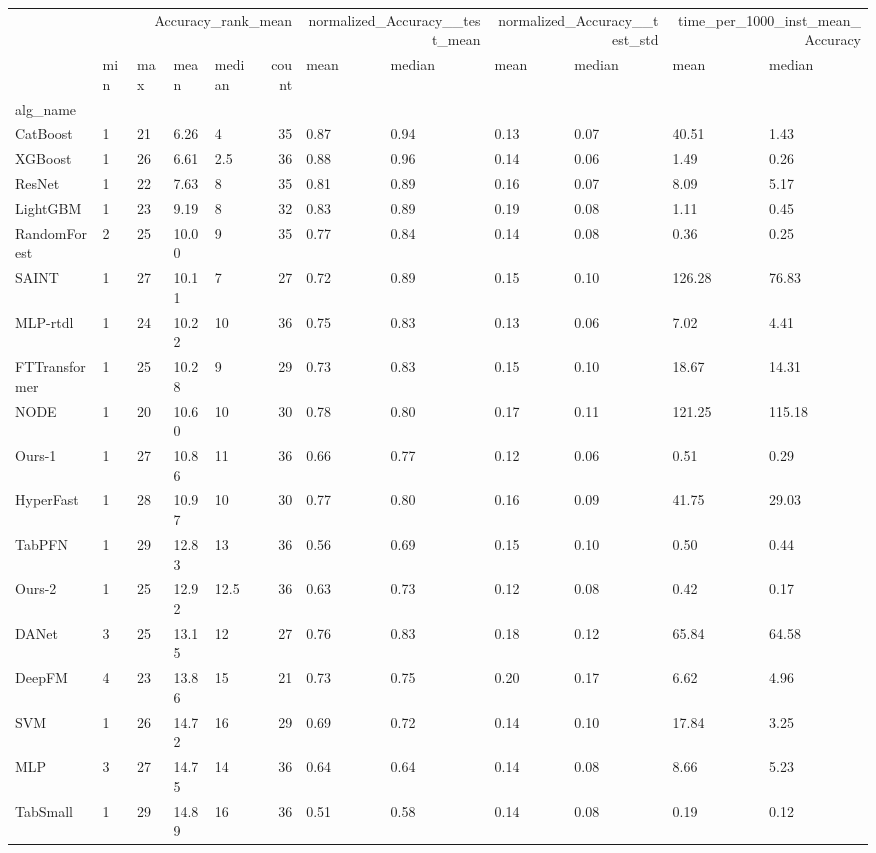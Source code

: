 \begin{tabular}{lllllrllllll}
\toprule
 & \multicolumn{5}{r}{Accuracy_rank_mean} & \multicolumn{2}{r}{normalized_Accuracy__test_mean} & \multicolumn{2}{r}{normalized_Accuracy__test_std} & \multicolumn{2}{r}{time_per_1000_inst_mean_Accuracy} \\
 & min & max & mean & median & count & mean & median & mean & median & mean & median \\
alg_name &  &  &  &  &  &  &  &  &  &  &  \\
\midrule
CatBoost & 1 & 21 & 6.26 & 4 & 35 & 0.87 & 0.94 & 0.13 & 0.07 & 40.51 & 1.43 \\
XGBoost & 1 & 26 & 6.61 & 2.5 & 36 & 0.88 & 0.96 & 0.14 & 0.06 & 1.49 & 0.26 \\
ResNet & 1 & 22 & 7.63 & 8 & 35 & 0.81 & 0.89 & 0.16 & 0.07 & 8.09 & 5.17 \\
LightGBM & 1 & 23 & 9.19 & 8 & 32 & 0.83 & 0.89 & 0.19 & 0.08 & 1.11 & 0.45 \\
RandomForest & 2 & 25 & 10.00 & 9 & 35 & 0.77 & 0.84 & 0.14 & 0.08 & 0.36 & 0.25 \\
SAINT & 1 & 27 & 10.11 & 7 & 27 & 0.72 & 0.89 & 0.15 & 0.10 & 126.28 & 76.83 \\
MLP-rtdl & 1 & 24 & 10.22 & 10 & 36 & 0.75 & 0.83 & 0.13 & 0.06 & 7.02 & 4.41 \\
FTTransformer & 1 & 25 & 10.28 & 9 & 29 & 0.73 & 0.83 & 0.15 & 0.10 & 18.67 & 14.31 \\
NODE & 1 & 20 & 10.60 & 10 & 30 & 0.78 & 0.80 & 0.17 & 0.11 & 121.25 & 115.18 \\
Ours-1 & 1 & 27 & 10.86 & 11 & 36 & 0.66 & 0.77 & 0.12 & 0.06 & 0.51 & 0.29 \\
HyperFast & 1 & 28 & 10.97 & 10 & 30 & 0.77 & 0.80 & 0.16 & 0.09 & 41.75 & 29.03 \\
TabPFN & 1 & 29 & 12.83 & 13 & 36 & 0.56 & 0.69 & 0.15 & 0.10 & 0.50 & 0.44 \\
Ours-2 & 1 & 25 & 12.92 & 12.5 & 36 & 0.63 & 0.73 & 0.12 & 0.08 & 0.42 & 0.17 \\
DANet & 3 & 25 & 13.15 & 12 & 27 & 0.76 & 0.83 & 0.18 & 0.12 & 65.84 & 64.58 \\
DeepFM & 4 & 23 & 13.86 & 15 & 21 & 0.73 & 0.75 & 0.20 & 0.17 & 6.62 & 4.96 \\
SVM & 1 & 26 & 14.72 & 16 & 29 & 0.69 & 0.72 & 0.14 & 0.10 & 17.84 & 3.25 \\
MLP & 3 & 27 & 14.75 & 14 & 36 & 0.64 & 0.64 & 0.14 & 0.08 & 8.66 & 5.23 \\
TabSmall & 1 & 29 & 14.89 & 16 & 36 & 0.51 & 0.58 & 0.14 & 0.08 & 0.19 & 0.12 \\

\end{tabular}
